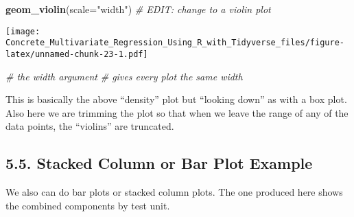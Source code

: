 \documentclass[]{article}
\newenvironment{Shaded}{\begin{snugshade}}{\end{snugshade}}
\newcommand{\CommentTok}[1]{\textcolor[rgb]{0.56,0.35,0.01}{\textit{#1}}}
\newcommand{\DataTypeTok}[1]{\textcolor[rgb]{0.13,0.29,0.53}{#1}}
\newcommand{\KeywordTok}[1]{\textcolor[rgb]{0.13,0.29,0.53}{\textbf{#1}}}
\newcommand{\NormalTok}[1]{#1}
\newcommand{\StringTok}[1]{\textcolor[rgb]{0.31,0.60,0.02}{#1}}
\begin{document}
\begin{Shaded}
\begin{Highlighting}[]
\StringTok{  }\KeywordTok{geom_violin}\NormalTok{(}\DataTypeTok{scale=}\StringTok{"width"}\NormalTok{) }\CommentTok{# EDIT: change to a violin plot }
\end{Highlighting}
\end{Shaded}

\texttt{[image: Concrete\_Multivariate\_Regression\_Using\_R\_with\_Tidyverse\_files/figure-latex/unnamed-chunk-23-1.pdf]}

\begin{Shaded}
\begin{Highlighting}[]
                             \CommentTok{#   the width argument }
                             \CommentTok{# gives every plot the same width  }
\end{Highlighting}
\end{Shaded}

This is basically the above ``density'' plot but ``looking down'' as
with a box plot. Also here we are trimming the plot so that when we
leave the range of any of the data points, the ``violins'' are
truncated.

\hypertarget{stacked-column-or-bar-plot-example}{%
\subsection{5.5. Stacked Column or Bar Plot
Example}\label{stacked-column-or-bar-plot-example}}

We also can do bar plots or stacked column plots. The one produced here
shows the combined components by test unit.
\end{document}
